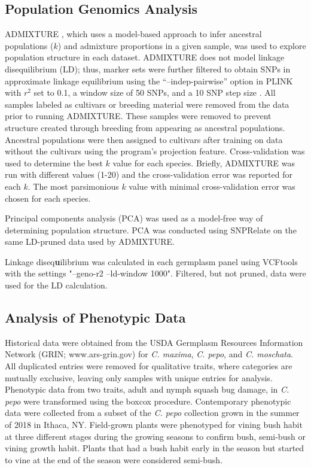 \documentclass[utf8]{FrontiersinHarvard} %
\begin{document}
\subsection{Population Genomics Analysis}
ADMIXTURE \citep{Alexander2011}, which uses a model-based approach to infer ancestral populations ($k$) and admixture proportions in a given sample, was used to explore population structure in each dataset. ADMIXTURE does not model linkage disequilibrium (LD); thus, marker sets were further filtered to obtain SNPs in approximate linkage equilibrium using the “–indep-pairwise” option in PLINK \citep{Purcell2007} with $r^{2}$ set to 0.1, a window size of 50 SNPs, and a 10 SNP step size . All samples labeled as cultivars or breeding material were removed from the data prior to running ADMIXTURE. These samples were removed to prevent structure created through breeding from appearing as ancestral populations. Ancestral populations were then assigned to cultivars after training on data without the cultivars using the program’s projection feature. Cross-validation was used to determine the best $k$ value for each species. Briefly, ADMIXTURE was run with different  values (1-20) and the cross-validation error was reported for each $k$. The most parsimonious $k$ value with minimal cross-validation error was chosen for each species.

Principal components analysis (PCA) was used as a model-free way of determining population structure. PCA was conducted using SNPRelate \citep{Zheng2012} on the same LD-pruned data used by ADMIXTURE.\textbf{}

Linkage diseq\textbf{u}ilibrium was calculated in each germplasm panel using VCFtools \citep{Danecek2011} with the settings "--geno-r2 --ld-window 1000". Filtered, but not pruned, data were used for the LD calculation.

\subsection{Analysis of Phenotypic Data}
Historical data were obtained from the USDA Germplasm Resources Information Network (GRIN; www.ars-grin.gov) for \textit{C. maxima}, \textit{C. pepo}, and \textit{C. moschata}. All duplicated entries were removed for qualitative traits, where categories are mutually exclusive, leaving only samples with unique entries for analysis. Phenotypic data from two traits, adult and nymph squash bug damage, in \textit{C. pepo} were transformed using the boxcox procedure. Contemporary phenotypic data were collected from a subset of the \textit{C. pepo} collection grown in the summer of 2018 in Ithaca, NY. Field-grown plants were phenotyped for vining bush habit at three different stages during the growing seasons to confirm bush, semi-bush or vining growth habit. Plants that had a bush habit early in the season but started to vine at the end of the season were considered semi-bush.
\end{document}
